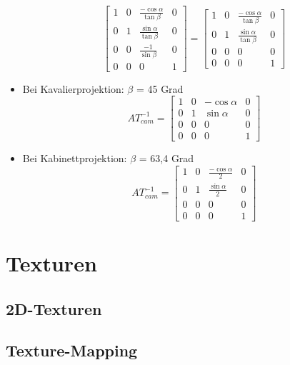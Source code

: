 \documentclass{scrartcl}
\begin{document}
\begin{itemize}
\begin{equation}
\begin{bmatrix}
		1 & 0 & \frac{-\cos \alpha}{\tan \beta} & 0 \\
		0 & 1 & \frac{\sin \alpha}{\tan \beta} & 0 \\
		0 & 0 & \frac{-1}{\sin \beta} & 0 \\
		0 & 0 & 0 & 1
		\end{bmatrix} = \begin{bmatrix}
		1 & 0 & \frac{-\cos \alpha}{\tan \beta} & 0 \\
		0 & 1 & \frac{\sin \alpha}{\tan \beta} & 0 \\
		0 & 0 & 0 & 0 \\
		0 & 0 & 0 & 1
		\end{bmatrix}
	\end{equation}
	\item Bei Kavalierprojektion: $\beta$ = 45 Grad
	\begin{equation}
		AT_{cam}^{-1} = \begin{bmatrix}
		1 & 0 & -\cos \alpha & 0 \\
		0 & 1 & \sin \alpha & 0 \\
		0 & 0 & 0 & 0 \\
		0 & 0 & 0 & 1
		\end{bmatrix}
	\end{equation}
	\item Bei Kabinettprojektion: $\beta$ = 63,4 Grad
	\begin{equation}
		AT_{cam}^{-1} = \begin{bmatrix}
		1 & 0 & \frac{-\cos \alpha}{2} & 0 \\
		0 & 1 & \frac{\sin \alpha}{2} & 0 \\
		0 & 0 & 0 & 0 \\
		0 & 0 & 0 & 1
		\end{bmatrix}
	\end{equation}
\end{itemize}

\section{Texturen}

\subsection{2D-Texturen}

\subsection{Texture-Mapping}
\end{document}
